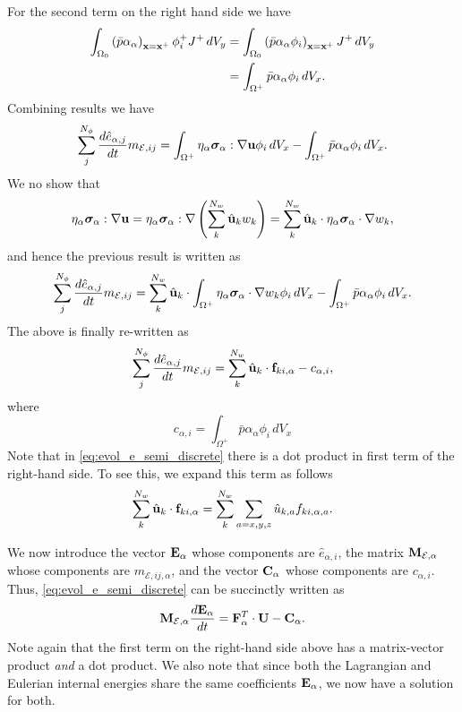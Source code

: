 \documentclass[11pt]{report}
\begin{document}
For the second term on the right hand side we have
\begin{align*}
    \int_{\Omega_0} \left( \bar{p} \alpha_\alpha \right)_{\mathbf{x} = \mathbf{x}^+} \phi_i^+ J^+ \, dV_y &= \int_{\Omega_0} \left( \bar{p} \alpha_\alpha \phi_i \right)_{\mathbf{x} = \mathbf{x}^+} J^+ \, dV_y \nonumber \\
    &= \int_{\Omega^+} \bar{p} \alpha_\alpha \phi_i \, dV_x. 
\end{align*}
Combining results we have
\begin{equation*}
    \sum_j^{N_\phi} \frac{d \hat{e}_{\alpha,j}}{dt} m_{\mathcal{E},ij} = \int_{\Omega^+} \eta_\alpha \bm \sigma_\alpha : \nabla \mathbf{u} \phi_i \, dV_x - \int_{\Omega^+} \bar{p} \alpha_\alpha \phi_i \, dV_x.
\end{equation*}
We no show that
\begin{equation*}
    \eta_\alpha \bm \sigma_\alpha : \nabla \mathbf{u} = \eta_\alpha \bm \sigma_\alpha : \nabla \left ( \sum_k^{N_w} \hat{\mathbf{u}}_k w_k \right ) = \sum_k^{N_w} \hat{\mathbf{u}}_k \cdot \eta_\alpha \bm \sigma_\alpha \cdot \nabla w_k,
\end{equation*}
and hence the previous result is written as
\begin{equation*}
    \sum_j^{N_\phi} \frac{d \hat{e}_{\alpha,j}}{dt} m_{\mathcal{E},ij} = \sum_k^{N_w} \hat{\mathbf{u}}_k \cdot \int_{\Omega^+} \eta_\alpha \bm \sigma_\alpha \cdot \nabla w_k \phi_i \, dV_x - \int_{\Omega^+} \bar{p} \alpha_\alpha \phi_i \, dV_x.
\end{equation*}
The above is finally re-written as
\begin{equation}
    \label{eq:evol_e_semi_discrete}
    \sum_j^{N_\phi} \frac{d \hat{e}_{\alpha,j}}{d t} m_{\mathcal{E},ij} = \sum_k^{N_w} \hat{\mathbf{u}}_k \cdot \mathbf{f}_{ki,\alpha} - c_{\alpha,i},
\end{equation}
where
\begin{equation}
    c_{\alpha,i} = \int_{\Omega^+} \bar{p} \alpha_\alpha \phi_i \, dV_x
\end{equation}
Note that in \cref{eq:evol_e_semi_discrete} there is a dot product in first term of the right-hand side. To see this, we expand this term as follows 
\begin{equation*}
    \sum_k^{N_w} \hat{\mathbf{u}}_k \cdot \mathbf{f}_{ki,\alpha} = \sum_k^{N_w} \sum_{a=x,y,z} \hat{u}_{k,a} f_{ki,\alpha,a}.
\end{equation*}

We now introduce the vector $\mathbf{E}_\alpha$ whose components are $\hat{e}_{\alpha,i}$, the matrix $\mathbf{M}_{\mathcal{E},\alpha}$ whose components are $m_{\mathcal{E},ij,\alpha}$, and the vector $\mathbf{C}_\alpha$ whose components are $c_{\alpha,i}$. Thus, \cref{eq:evol_e_semi_discrete} can be succinctly written as
\begin{equation}
    \label{eq:evol_energy_semi_discrete}
    \mathbf{M}_{\mathcal{E},\alpha} \frac{d\mathbf{E}_\alpha}{dt} = \mathbf{F}^T_\alpha \cdot \mathbf{U} - \mathbf{C}_\alpha.
\end{equation}
Note again that the first term on the right-hand side above has a matrix-vector product \textit{and} a dot product. We also note that since both the Lagrangian and Eulerian internal energies share the same coefficients $\mathbf{E}_\alpha$, we now have a solution for both.
\end{document}
